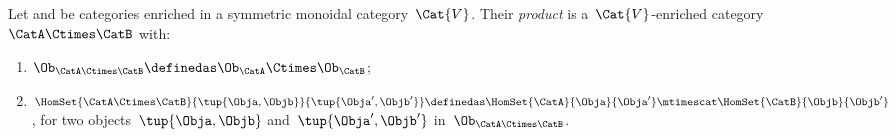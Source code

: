 \begin{definition}
    \label{def:prod_enrich_cat}
    Let \CatA and \CatB be categories enriched in a symmetric monoidal category~$\Cat{V}$.
    Their \emph{product} is a~$\Cat{V}$-enriched category~$\CatA\Ctimes \CatB$ with:
    \begin{enumerate}
        \item $\Ob_{\CatA\Ctimes \CatB}\definedas \Ob_\CatA \Ctimes \Ob_\CatB$;
        \item $\HomSet{\CatA\Ctimes \CatB}{\tup{\Obja,\Objb}}{\tup{\Obja',\Objb'}}\definedas \HomSet{\CatA}{\Obja}{\Obja'}\mtimescat \HomSet{\CatB}{\Objb}{\Objb'}$, for two objects~$\tup{\Obja,\Objb}$ and~$\tup{\Obja',\Objb'}$ in~$\Ob_{\CatA\Ctimes \CatB}$.
    \end{enumerate}
\end{definition}


